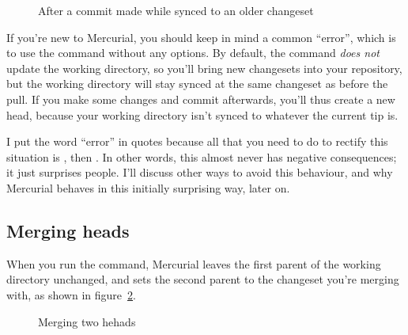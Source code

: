 \begin{figure}[ht]
  \centering
  \caption{After a commit made while synced to an older changeset}
  \label{fig:concepts:wdir-branch}
\end{figure}

\begin{note}
  If you're new to Mercurial, you should keep in mind a common
  ``error'', which is to use the  command without any
  options.  By default, the  command \emph{does not}
  update the working directory, so you'll bring new changesets into
  your repository, but the working directory will stay synced at the
  same changeset as before the pull.  If you make some changes and
  commit afterwards, you'll thus create a new head, because your
  working directory isn't synced to whatever the current tip is.

  I put the word ``error'' in quotes because all that you need to do
  to rectify this situation is , then .  In
  other words, this almost never has negative consequences; it just
  surprises people.  I'll discuss other ways to avoid this behaviour,
  and why Mercurial behaves in this initially surprising way, later
  on.
\end{note}

\subsection{Merging heads}

When you run the  command, Mercurial leaves the first
parent of the working directory unchanged, and sets the second parent
to the changeset you're merging with, as shown in
figure~\ref{fig:concepts:wdir-merge}.

\begin{figure}[ht]
  \centering
  \caption{Merging two hehads}
  \label{fig:concepts:wdir-merge}
\end{figure}

